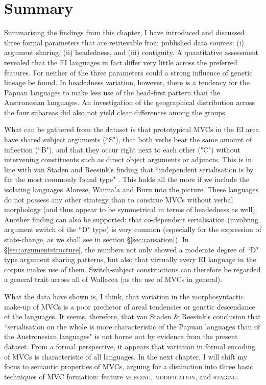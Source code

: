 \section{Summary}

Summarising the findings from this chapter, I have introduced and discussed three formal parameters that are retrievable from published data sources: (i) argument sharing, (ii) headedness, and (iii) contiguity. A quantitative assessment revealed that the EI languages in fact differ very little across the preferred features. For neither of the three parameters could a strong influence of genetic lineage be found. In headedness variation, however, there is a tendency for the Papuan languages to make less use of the head-first pattern than the Austronesian languages. An investigation of the geographical distribution across the four subareas did also not yield clear differences among the groups.

What can be gathered from the dataset is that prototypical MVCs in the EI area have shared subject arguments (``S"), that both verbs bear the same amount of inflection (``B"), and that they occur right next to each other ("C") without intervening constituents such as direct object arguments or adjuncts. This is in line with van Staden and Reesink's finding that ``independent serialisation is by far the most commonly found type" \citep[48]{vanstaden2008serial}. This holds all the more if we include the isolating languages Alorese, Waima'a and Buru into the picture. These languages do not possess any other strategy than to construe MVCs without verbal morphology (and thus appear to be symmetrical in terms of headedness as well). Another finding can also be supported: that co-dependent serialisation (involving argument switch of the ``D" type) is very common (especially for the expression of state-change, as we shall see in section §\ref{sec:causation}). In §\ref{sec:argumentstructure}, the numbers not only showed a moderate degree of ``D" type argument sharing patterns, but also that virtually every EI language in the corpus makes use of them. Switch-subject constructions can therefore be regarded a general trait across all of Wallacea (as the use of MVCs in general).

What the data have shown is, I think, that variation in the morphosyntactic make-up of MVCs is a poor predictor of areal tendencies or genetic descendance of the languages. It seems, therefore, that van Staden \& Reesink's conclusion that ``serialisation on the whole is more characteristic of the Papuan languages than of the Austronesian languages" \citep[50]{vanstaden2008serial} is not borne out by evidence from the present dataset. From a formal perspective, it appears that variation in formal encoding of MVCs is characteristic of all languages. In the next chapter, I will shift my focus to semantic properties of MVCs, arguing for a distinction into three basic techniques of MVC formation: feature \textsc{merging}, \textsc{modification}, and \textsc{staging}.
